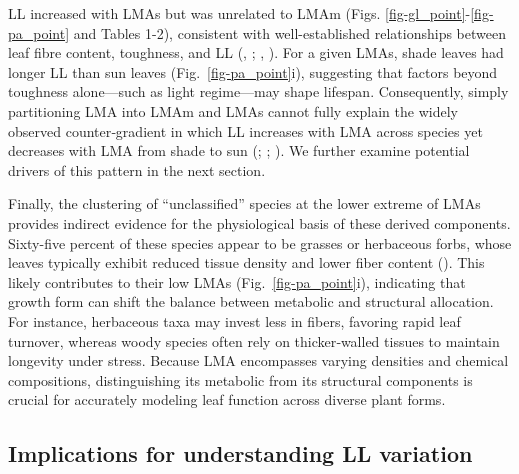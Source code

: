 \documentclass[
  12pt,
  letterpaper,
  DIV=11,
  numbers=noendperiod]{scrartcl}
\begin{document}
LL increased with LMAs but was unrelated to LMAm (Figs.
\ref{fig-gl_point}-\ref{fig-pa_point} and Tables 1-2), consistent with
well-established relationships between leaf fibre content, toughness,
and LL (,
; , ). For a given LMAs, shade
leaves had longer LL than sun leaves (Fig.~\ref{fig-pa_point}i),
suggesting that factors beyond toughness alone---such as light
regime---may shape lifespan. Consequently, simply partitioning LMA into
LMAm and LMAs cannot fully explain the widely observed counter‐gradient
in which LL increases with LMA across species yet decreases with LMA
from shade to sun (;
;
). We further examine
potential drivers of this pattern in the next section.

Finally, the clustering of ``unclassified'' species at the lower extreme
of LMAs provides indirect evidence for the physiological basis of these
derived components. Sixty-five percent of these species appear to be
grasses or herbaceous forbs, whose leaves typically exhibit reduced
tissue density and lower fiber content (). This likely contributes to their low LMAs
(Fig.~\ref{fig-pa_point}i), indicating that growth form can shift the
balance between metabolic and structural allocation. For instance,
herbaceous taxa may invest less in fibers, favoring rapid leaf turnover,
whereas woody species often rely on thicker‐walled tissues to maintain
longevity under stress. Because LMA encompasses varying densities and
chemical compositions, distinguishing its metabolic from its structural
components is crucial for accurately modeling leaf function across
diverse plant forms.

\subsection{Implications for understanding LL
variation}\label{implications-for-understanding-ll-variation}
\end{document}
